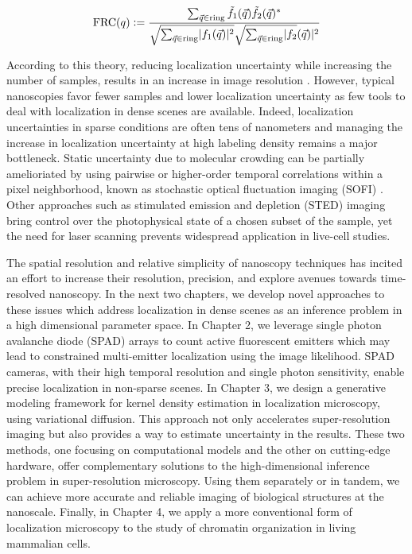 \begin{equation}
\mathrm{FRC}(q) \vcentcolon = \frac{\sum_{\vec{q}\in\mathrm{ring}}\tilde{f_{1}}(\vec{q})\tilde{f_{2}}(\vec{q})^{*}}{\sqrt{\sum_{\vec{q}\in\mathrm{ring}}\lvert f_{1}(\vec{q})\lvert^{2}}\sqrt{\sum_{\vec{q}\in\mathrm{ring}}\lvert f_{2}}(\vec{q})\lvert^{2}}
\end{equation}

According to this theory, reducing localization uncertainty while increasing the number of samples, results in an increase in image resolution \parencite{Nieuwenhuizen2013}. However, typical nanoscopies favor fewer samples and lower localization uncertainty as few tools to deal with localization in dense scenes are available. Indeed, localization uncertainties in sparse conditions are often tens of nanometers and managing the increase in localization uncertainty at high labeling density remains a major bottleneck. Static uncertainty due to molecular crowding can be partially amelioriated by using pairwise or higher-order temporal correlations within a pixel neighborhood, known as stochastic optical fluctuation imaging (SOFI) \parencite{Dertinger2009}. Other approaches such as stimulated emission and depletion (STED) imaging bring control over the photophysical state of a chosen subset of the sample, yet the need for laser scanning prevents widespread application in live-cell studies. 

The spatial resolution and relative simplicity of nanoscopy techniques has incited an effort to increase their resolution, precision, and explore avenues towards time-resolved nanoscopy. In the next two chapters, we develop novel approaches to these issues which address localization in dense scenes as an inference problem in a high dimensional parameter space. In Chapter 2,  we leverage single photon avalanche diode (SPAD) arrays to count active fluorescent emitters which may lead to constrained multi-emitter localization using the image likelihood. SPAD cameras, with their high temporal resolution and single photon sensitivity, enable precise localization in non-sparse scenes. In Chapter 3, we design a generative modeling framework for kernel density estimation in localization microscopy, using variational diffusion. This approach not only accelerates super-resolution imaging but also provides a way to estimate uncertainty in the results. These two methods, one focusing on computational models and the other on cutting-edge hardware, offer complementary solutions to the high-dimensional inference problem in super-resolution microscopy. Using them separately or in tandem, we can achieve more accurate and reliable imaging of biological structures at the nanoscale. Finally, in Chapter 4, we apply a more conventional form of localization microscopy to the study of chromatin organization in living mammalian cells. 

